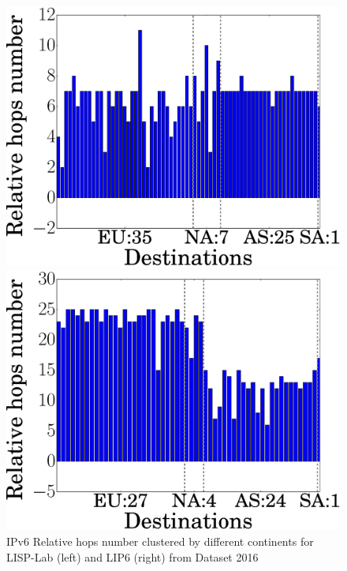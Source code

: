 \begin{figure}[!t]
	\begin{minipage}[c]{.49\linewidth}
		\begin{center}
			\includegraphics[width=\textwidth]{Pics/v6/Relative_hops_num_LISP-Lab-FranceIX_changed_60.eps}
		\end{center}
	\end{minipage}
	\begin{minipage}[c]{.49\linewidth}
		\begin{center}
			\includegraphics[width=\textwidth]{Pics/v6/Relative_hops_num_LIP6-FranceIX_changed_60.eps}
		\end{center}
	\end{minipage}
	\vspace{-0.5mm}
	\caption{IPv6 Relative hops number clustered by different continents for LISP-Lab (left) and LIP6 (right) from Dataset 2016}
	\label{v6_Relative_hops_num}
\end{figure}



